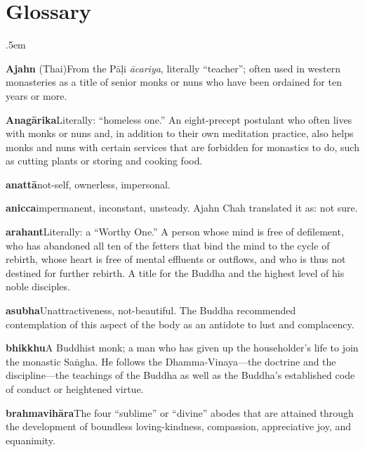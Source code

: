 \chapter{Glossary}
{\parindent 0pt \parskip .5em
\newcommand{\glosskip}{.6em}

\textbf{Ajahn} (Thai)\hspace{\glosskip}From the Pāḷi \emph{ācariya}, literally 
``teacher''; often used in western monasteries as a title of senior 
monks or nuns who have been ordained for ten years or more.

\textbf{Anagārika}\hspace{\glosskip}Literally: ``homeless one.'' An eight-precept 
postulant who often lives with monks or nuns and, in addition to their 
own meditation practice, also helps monks and nuns with certain 
services that are forbidden for monastics to do, such as cutting plants 
or storing and cooking food.

\textbf{anattā}\hspace{\glosskip}not-self, ownerless, impersonal.

\textbf{anicca}\hspace{\glosskip}impermanent, inconstant, unsteady. Ajahn Chah 
translated it as: not sure.

\textbf{arahant}\hspace{\glosskip}Literally: a ``Worthy One.'' A person whose mind is free 
of defilement, who has abandoned all ten of the fetters that bind the 
mind to the cycle of rebirth, whose heart is free of mental effluents 
or outflows, and who is thus not destined for further rebirth. A title 
for the Buddha and the highest level of his noble disciples.

\textbf{asubha}\hspace{\glosskip}Unattractiveness, not-beautiful. The Buddha recommended 
contemplation of this aspect of the body as an antidote to lust and 
complacency.

\textbf{bhikkhu}\hspace{\glosskip}A Buddhist monk; a man who has given up the 
householder's life to join the monastic Saṅgha. He follows the 
Dhamma-Vinaya---the doctrine and the discipline---the teachings of the 
Buddha as well as the Buddha's established code of conduct or 
heightened virtue.

\textbf{brahmavihāra}\hspace{\glosskip}The four ``sublime'' or ``divine'' abodes that 
are attained through the development of boundless loving-kindness, 
compassion, appreciative joy, and equanimity.

}

